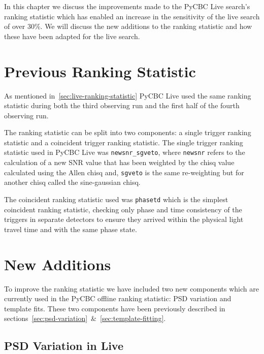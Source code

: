 

In this chapter we discuss the improvements made to the PyCBC Live search's ranking statistic which has enabled an increase in the sensitivity of the live search of over 30\%. We will discuss the new additions to the ranking statistic and how these have been adapted for the live search.

\section{\label{live-previous-stat}Previous Ranking Statistic}

As mentioned in~\ref{sec:live-ranking-statistic} PyCBC Live used the same ranking statistic during both the third observing run and the first half of the fourth observing run.

The ranking statistic can be split into two components: a single trigger ranking statistic and a coincident trigger ranking statistic. The single trigger ranking statistic used in PyCBC Live was \verb|newsnr_sgveto|, where \verb|newsnr| refers to the calculation of a new SNR value that has been weighted by the chisq value calculated using the Allen chisq and, \verb|sgveto| is the same re-weighting but for another chisq called the sine-gaussian chisq.

The coincident ranking statistic used was \verb|phasetd| which is the simplest coincident ranking statistic, checking only phase and time consistency of the triggers in separate detectors to ensure they arrived within the physical light travel time and with the same phase state.

\section{\label{live-new-additions}New Additions}

To improve the ranking statistic we have included two new components which are currently used in the PyCBC offline ranking statistic: PSD variation and template fits. These two components have been previously described in sections~\ref{sec:psd-variation}~\&~\ref{sec:template-fitting}.

\subsection{\label{live-psd-var}PSD Variation in Live}

